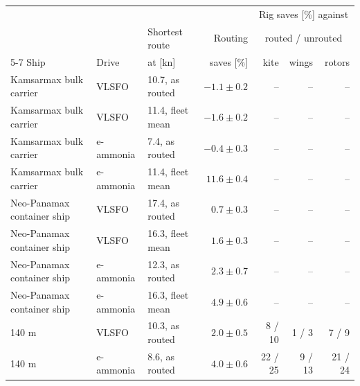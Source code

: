 \begin{tabular}{@{}lllrrrr@{}}
\toprule
 & & & & \multicolumn{3}{c}{Rig saves [\%] against} \\
 & & Shortest route & Routing & \multicolumn{3}{c}{routed / unrouted} \\
\cmidrule(lr){5-7}
Ship & Drive & at [kn] & saves [\%] & kite & wings & rotors \\
\midrule
Kamsarmax bulk carrier & VLSFO & 10.7, as routed & $-1.1 \pm 0.2$ & -- & -- & -- \\
Kamsarmax bulk carrier & VLSFO & 11.4, fleet mean & $-1.6 \pm 0.2$ & -- & -- & -- \\
Kamsarmax bulk carrier & e-ammonia & 7.4, as routed & $-0.4 \pm 0.3$ & -- & -- & -- \\
Kamsarmax bulk carrier & e-ammonia & 11.4, fleet mean & $11.6 \pm 0.4$ & -- & -- & -- \\
Neo-Panamax container ship & VLSFO & 17.4, as routed & $0.7 \pm 0.3$ & -- & -- & -- \\
Neo-Panamax container ship & VLSFO & 16.3, fleet mean & $1.6 \pm 0.3$ & -- & -- & -- \\
Neo-Panamax container ship & e-ammonia & 12.3, as routed & $2.3 \pm 0.7$ & -- & -- & -- \\
Neo-Panamax container ship & e-ammonia & 16.3, fleet mean & $4.9 \pm 0.6$ & -- & -- & -- \\
140 m & VLSFO & 10.3, as routed & $2.0 \pm 0.5$ & 8 / 10 & 1 / 3 & 7 / 9 \\
140 m & e-ammonia & 8.6, as routed & $4.0 \pm 0.6$ & 22 / 25 & 9 / 13 & 21 / 24 \\
\bottomrule
\end{tabular}
